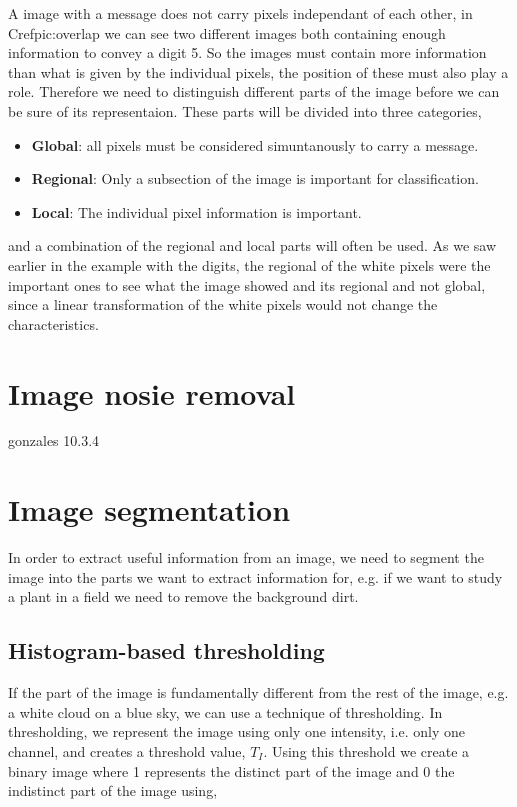 A image with a message does not carry pixels independant of each other, in Cref{pic:overlap} we can see two different images both containing enough information to convey a digit 5. So the images must contain more information than what is given by the individual pixels, the position of these must also play a role. Therefore we need to distinguish different parts of the image before we can be sure of its representaion. These parts will be divided into three categories,

\begin{itemize}
    \item \textbf{Global}: all pixels must be considered simuntanously to carry a message.
    \item \textbf{Regional}: Only a subsection of the image is important for classification.
    \item \textbf{Local}: The individual pixel information is important.
\end{itemize}

and a combination of the regional and local parts will often be used. As we saw earlier in the example with the digits, the regional of the white pixels were the important ones to see what the image showed and its regional and not global, since a linear transformation of the white pixels would not change the characteristics.

\section{Image nosie removal}

gonzales 10.3.4

\section{Image segmentation}

In order to extract useful information from an image, we need to segment the image into the parts we want to extract information for, e.g. if we want to study a plant in a field we need to remove the background dirt.

\subsection{Histogram-based thresholding}

If the part of the image is fundamentally different from the rest of the image, e.g. a white cloud on a blue sky, we can use a technique of thresholding. In thresholding, we represent the image using only one intensity, i.e. only one channel, and creates a threshold value, $T_I$. Using this threshold we create a binary image where 1 represents the distinct part of the image and 0 the indistinct part of the image using,

